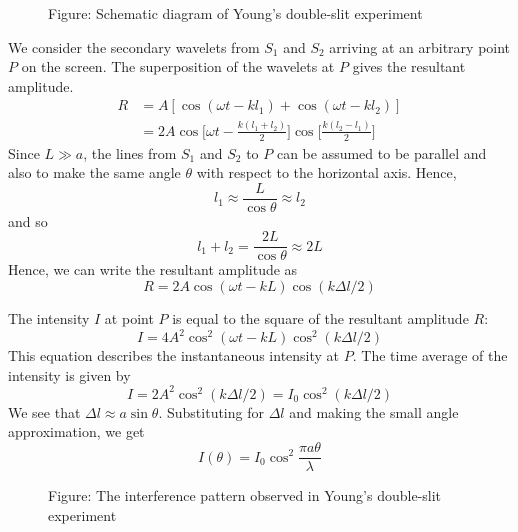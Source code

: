 \documentclass[../../../main.tex]{subfiles}
\begin{document}
\begin{figure*}[h]
    \centering
    \caption*{Figure: Schematic diagram of Young's double-slit experiment}
\end{figure*}

We consider the secondary wavelets from $S_1$ and $S_2$ arriving at an arbitrary point $P$ on the screen. The superposition of the wavelets at $P$ gives the resultant amplitude. 
\begin{align*}
    R &= A[\cos(\omega t - kl_1) + \cos(\omega t - kl_2)]\\
    &=2A\cos\bigg[\omega t-\frac{k(l_1+l_2)}{2}\bigg] \cos \bigg[\frac{k(l_2-l_1)}{2}\bigg]
\end{align*}
Since $L \gg a$, the lines from $S_1$ and $S_2$ to $P$ can be assumed to be parallel and also to make the same angle $\theta$ with respect to the horizontal axis. Hence,
\begin{equation*}
    l_1\approx\frac{L}{\cos \theta}\approx l_2
\end{equation*}
and so 
\begin{equation*}
    l_1+l_2=\frac{2L}{\cos \theta}\approx2L
\end{equation*}
Hence, we can write the resultant amplitude as
\begin{equation*}
    R= 2A\cos (\omega t -kL) \cos (k\Delta l/2)
\end{equation*}

The intensity $I$ at point $P$ is equal to the square of the resultant amplitude $R$:
\begin{equation*}
    I=4A^2\cos^2 (\omega t -kL) \cos^2 (k\Delta l/2)
\end{equation*}
This equation describes the instantaneous intensity at $P $. The time average of the intensity is given by
\begin{equation*}
    I=2A^2\cos^2 (k\Delta l/2)=I_0\cos^2 (k\Delta l/2)
\end{equation*}
We see that $\Delta l\approx a\sin \theta$. Substituting for $\Delta l$ and making the small angle approximation, we get 
\begin{equation*}
    I(\theta)=I_0\cos^2  \frac{\pi a \theta}{\lambda}
\end{equation*}
\begin{figure*}
    \centering
    \caption*{Figure: The interference pattern observed in Young's double-slit experiment} 
\end{figure*}
\end{document}
